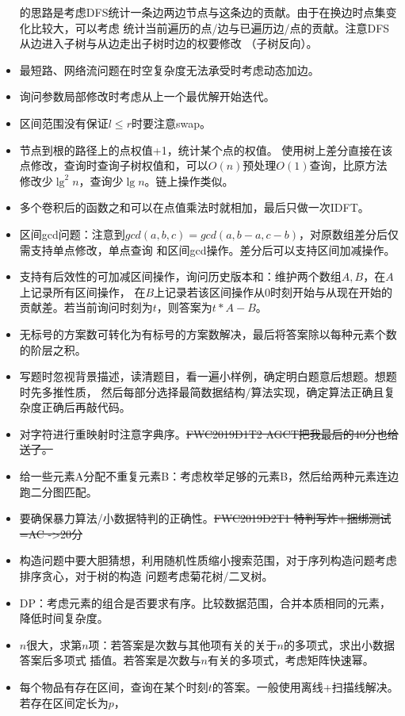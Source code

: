 \begin{itemize}
	      的思路是考虑DFS统计一条边两边节点与这条边的贡献。由于在换边时点集变化比较大，可以考虑
	      统计当前遍历的点/边与已遍历边/点的贡献。注意DFS从边进入子树与从边走出子树时边的权要修改
	      （子树反向）。
	\item 最短路、网络流问题在时空复杂度无法承受时考虑动态加边。
	\item 询问参数局部修改时考虑从上一个最优解开始迭代。
	\item 区间范围没有保证$l\leq r$时要注意swap。
	\item 节点到根的路径上的点权值+1，统计某个点的权值。
	使用树上差分直接在该点修改，查询时查询子树权值和，可以$O(n)$预处理$O(1)$查询，比原方法
	修改少$\lg^2 n$，查询少$\lg n$。链上操作类似。
	\item 多个卷积后的函数之和可以在点值乘法时就相加，最后只做一次IDFT。
	\item 区间gcd问题：注意到$gcd(a,b,c)=gcd(a,b-a,c-b)$，对原数组差分后仅需支持单点修改，单点查询
	和区间gcd操作。差分后可以支持区间加减操作。
	\item 支持有后效性的可加减区间操作，询问历史版本和：维护两个数组$A,B$，在$A$上记录所有区间操作，
	在$B$上记录若该区间操作从0时刻开始与从现在开始的贡献差。若当前询问时刻为$t$，则答案为$t*A-B$。
	\label{HistorySum}
	\item 无标号的方案数可转化为有标号的方案数解决，最后将答案除以每种元素个数的阶层之积。
	\item 写题时忽视背景描述，读清题目，看一遍小样例，确定明白题意后想题。想题时先多推性质，
	然后每部分选择最简数据结构/算法实现，确定算法正确且复杂度正确后再敲代码。
	\item 对字符进行重映射时注意字典序。\sout{FWC2019D1T2 AGCT把我最后的40分也给送了。}
	\item 给一些元素A分配不重复元素B：考虑枚举足够的元素B，然后给两种元素连边跑二分图匹配。
	\item 要确保暴力算法/小数据特判的正确性。\sout{FWC2019D2T1 特判写炸+捆绑测试=AC
	->20分}
	\item 构造问题中要大胆猜想，利用随机性质缩小搜索范围，对于序列构造问题考虑排序贪心，对于树的构造
	问题考虑菊花树/二叉树。
	\item DP：考虑元素的组合是否要求有序。比较数据范围，合并本质相同的元素，降低时间复杂度。
	\item $n$很大，求第$n$项：若答案是次数与其他项有关的关于$n$的多项式，求出小数据答案后多项式
	插值。若答案是次数与$n$有关的多项式，考虑矩阵快速幂。
	\item 每个物品有存在区间，查询在某个时刻$t$的答案。一般使用离线+扫描线解决。若存在区间定长为$p$，

\end{itemize}
